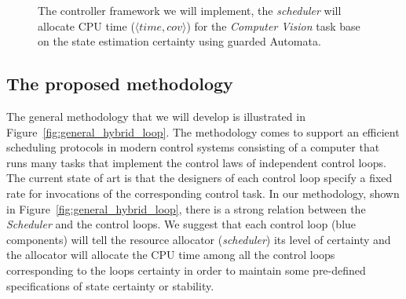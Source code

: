 \documentclass[11pt]{article}
\begin{document}
\begin{figure}[h]
    \centering
    
    \caption{The controller framework we will implement, the \textit{scheduler} will allocate CPU time ($\langle time,cov \rangle$) for the \textit{Computer Vision} task base on the state estimation certainty using guarded Automata.
    \label{fig:hybrid_loop}}
\end{figure}

\subsection{The proposed methodology}
\label{sec:our proposal}

The general methodology that we will develop is illustrated in Figure~\ref{fig:general_hybrid_loop}.
The methodology comes to support an efficient scheduling protocols in modern control systems consisting of a computer that runs many tasks that implement the control laws of independent control loops. 
The current state of art is that the designers of each control loop specify a fixed rate for invocations of the corresponding control task.
In our methodology, shown in Figure~\ref{fig:general_hybrid_loop}, there is a strong relation between the \textit{Scheduler} and the control loops. We suggest that each control loop (blue components) will tell the resource allocator (\textit{scheduler}) its level of certainty and the allocator will allocate the CPU time among all the control loops corresponding to the loops certainty in order to maintain some pre-defined specifications of state certainty or stability.
\end{document}
